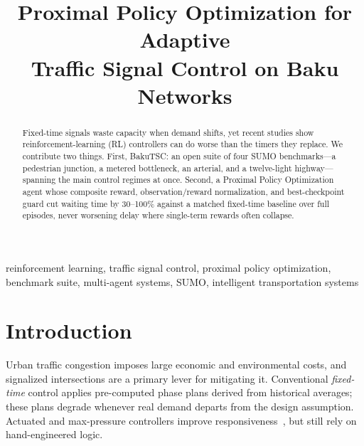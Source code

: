 \documentclass[conference,a4paper]{IEEEtran}
\begin{document}
\title{Proximal Policy Optimization for Adaptive\\
Traffic Signal Control on Baku Networks}

\author{%
\and
{}
}

\maketitle

\begin{abstract}
Fixed-time signals waste capacity when demand shifts, yet recent studies show
reinforcement-learning (RL) controllers can do worse than the timers they
replace. We contribute two things. First, BakuTSC: an open suite of four SUMO
benchmarks---a pedestrian junction, a metered bottleneck, an arterial, and a
twelve-light highway---spanning the main control regimes at once. Second, a
Proximal Policy Optimization agent whose composite reward, observation/reward
normalization, and best-checkpoint guard cut waiting time by 30--100\% against a
matched fixed-time baseline over full episodes, never worsening delay where
single-term rewards often collapse.
\end{abstract}

\begin{IEEEkeywords}
reinforcement learning, traffic signal control, proximal policy optimization,
benchmark suite, multi-agent systems, SUMO, intelligent transportation systems
\end{IEEEkeywords}

\section{Introduction}
Urban traffic congestion imposes large economic and environmental costs, and
signalized intersections are a primary lever for mitigating it. Conventional
\emph{fixed-time} control applies pre-computed phase plans derived from
historical averages; these plans
degrade whenever real demand departs from the design assumption. Actuated and
max-pressure controllers improve responsiveness~\cite{varaiya2013max,cools2013self},
but still rely on hand-engineered logic.
\end{document}
